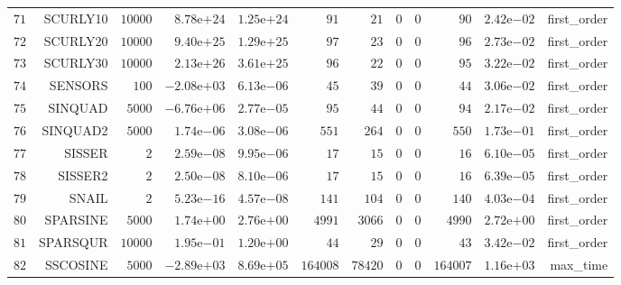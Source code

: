 \begin{longtable}{rrrrrrrrrrrr}
  \(    71\) & SCURLY10 & \( 10000\) & \( 8.78\)e\(+24\) & \( 1.25\)e\(+24\) & \(    91\) & \(    21\) & \(     0\) & \(     0\) & \(    90\) & \( 2.42\)e\(-02\) & first\_order \\
  \(    72\) & SCURLY20 & \( 10000\) & \( 9.40\)e\(+25\) & \( 1.29\)e\(+25\) & \(    97\) & \(    23\) & \(     0\) & \(     0\) & \(    96\) & \( 2.73\)e\(-02\) & first\_order \\
  \(    73\) & SCURLY30 & \( 10000\) & \( 2.13\)e\(+26\) & \( 3.61\)e\(+25\) & \(    96\) & \(    22\) & \(     0\) & \(     0\) & \(    95\) & \( 3.22\)e\(-02\) & first\_order \\
  \(    74\) & SENSORS & \(   100\) & \(-2.08\)e\(+03\) & \( 6.13\)e\(-06\) & \(    45\) & \(    39\) & \(     0\) & \(     0\) & \(    44\) & \( 3.06\)e\(-02\) & first\_order \\
  \(    75\) & SINQUAD & \(  5000\) & \(-6.76\)e\(+06\) & \( 2.77\)e\(-05\) & \(    95\) & \(    44\) & \(     0\) & \(     0\) & \(    94\) & \( 2.17\)e\(-02\) & first\_order \\
  \(    76\) & SINQUAD2 & \(  5000\) & \( 1.74\)e\(-06\) & \( 3.08\)e\(-06\) & \(   551\) & \(   264\) & \(     0\) & \(     0\) & \(   550\) & \( 1.73\)e\(-01\) & first\_order \\
  \(    77\) & SISSER & \(     2\) & \( 2.59\)e\(-08\) & \( 9.95\)e\(-06\) & \(    17\) & \(    15\) & \(     0\) & \(     0\) & \(    16\) & \( 6.10\)e\(-05\) & first\_order \\
  \(    78\) & SISSER2 & \(     2\) & \( 2.50\)e\(-08\) & \( 8.10\)e\(-06\) & \(    17\) & \(    15\) & \(     0\) & \(     0\) & \(    16\) & \( 6.39\)e\(-05\) & first\_order \\
  \(    79\) & SNAIL & \(     2\) & \( 5.23\)e\(-16\) & \( 4.57\)e\(-08\) & \(   141\) & \(   104\) & \(     0\) & \(     0\) & \(   140\) & \( 4.03\)e\(-04\) & first\_order \\
  \(    80\) & SPARSINE & \(  5000\) & \( 1.74\)e\(+00\) & \( 2.76\)e\(+00\) & \(  4991\) & \(  3066\) & \(     0\) & \(     0\) & \(  4990\) & \( 2.72\)e\(+00\) & first\_order \\
  \(    81\) & SPARSQUR & \( 10000\) & \( 1.95\)e\(-01\) & \( 1.20\)e\(+00\) & \(    44\) & \(    29\) & \(     0\) & \(     0\) & \(    43\) & \( 3.42\)e\(-02\) & first\_order \\
  \(    82\) & SSCOSINE & \(  5000\) & \(-2.89\)e\(+03\) & \( 8.69\)e\(+05\) & \(164008\) & \( 78420\) & \(     0\) & \(     0\) & \(164007\) & \( 1.16\)e\(+03\) & max\_time \\

\end{longtable}
